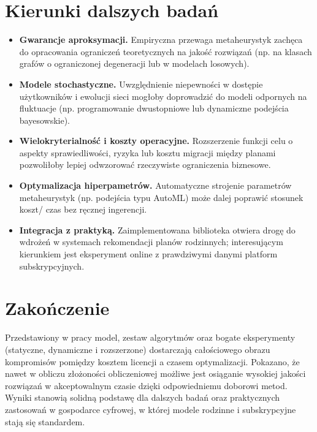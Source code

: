 \section{Kierunki dalszych badań}

\begin{itemize}
  \item \textbf{Gwarancje aproksymacji.} Empiryczna przewaga metaheurystyk zachęca do opracowania ograniczeń teoretycznych na jakość rozwiązań (np. na klasach grafów o ograniczonej degeneracji lub w modelach losowych).
  \item \textbf{Modele stochastyczne.} Uwzględnienie niepewności w dostępie użytkowników i ewolucji sieci mogłoby doprowadzić do modeli odpornych na fluktuacje (np. programowanie dwustopniowe lub dynamiczne podejścia bayesowskie).
  \item \textbf{Wielokryterialność i koszty operacyjne.} Rozszerzenie funkcji celu o aspekty sprawiedliwości, ryzyka lub kosztu migracji między planami pozwoliłoby lepiej odwzorować rzeczywiste ograniczenia biznesowe.
  \item \textbf{Optymalizacja hiperpametrów.} Automatyczne strojenie parametrów metaheurystyk (np. podejścia typu AutoML) może dalej poprawić stosunek koszt/ czas bez ręcznej ingerencji.
  \item \textbf{Integracja z praktyką.} Zaimplementowana biblioteka otwiera drogę do wdrożeń w systemach rekomendacji planów rodzinnych; interesującym kierunkiem jest eksperyment online z prawdziwymi danymi platform subskrypcyjnych.
\end{itemize}

\section{Zakończenie}

Przedstawiony w pracy model, zestaw algorytmów oraz bogate eksperymenty (statyczne, dynamiczne i rozszerzone) dostarczają całościowego obrazu kompromisów pomiędzy kosztem licencji a czasem optymalizacji. Pokazano, że nawet w obliczu złożoności obliczeniowej możliwe jest osiąganie wysokiej jakości rozwiązań w akceptowalnym czasie dzięki odpowiedniemu doborowi metod. Wyniki stanowią solidną podstawę dla dalszych badań oraz praktycznych zastosowań w gospodarce cyfrowej, w której modele rodzinne i subskrypcyjne stają się standardem.
